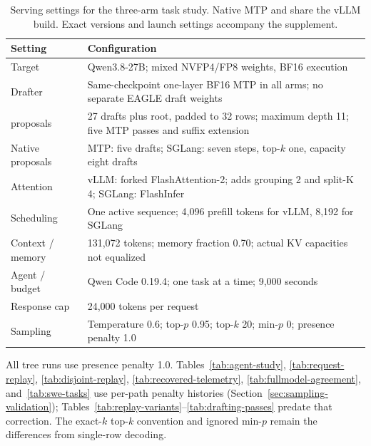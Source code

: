 \begin{table}[!htbp]
\caption{Serving settings for the three-arm task study. Native MTP and \sys{} share the vLLM build. Exact versions and launch settings accompany the supplement.}
\label{tab:serving-config}
\centering\footnotesize
\renewcommand{\arraystretch}{1.12}
\begin{tabularx}{\columnwidth}{@{}>{\raggedright\arraybackslash}p{}Y@{}}
\toprule
Setting & Configuration \\
\midrule
Target & Qwen3.8-27B; mixed NVFP4/FP8 weights, BF16 execution \\
Drafter & Same-checkpoint one-layer BF16 MTP in all arms; no separate EAGLE draft weights \\
\sys{} proposals & 27 drafts plus root, padded to 32 rows; maximum depth 11; five MTP passes and suffix extension \\
Native proposals & MTP: five drafts; SGLang: seven steps, top-$k$ one, capacity eight drafts \\
Attention & vLLM: forked FlashAttention-2; \sys{} adds grouping 2 and split-K 4; SGLang: FlashInfer \\
Scheduling & One active sequence; 4,096 prefill tokens for vLLM, 8,192 for SGLang \\
Context / memory & 131,072 tokens; memory fraction 0.70; actual KV capacities not equalized \\
Agent / budget & Qwen Code 0.19.4; one task at a time; 9,000 seconds \\
Response cap & 24,000 tokens per request \\
Sampling & Temperature 0.6; top-$p$ 0.95; top-$k$ 20; min-$p$ 0; presence penalty 1.0 \\
\bottomrule
\end{tabularx}
\end{table}

All tree runs use presence penalty 1.0. Tables~\ref{tab:agent-study}, \ref{tab:request-replay}, \ref{tab:disjoint-replay}, \ref{tab:recovered-telemetry}, \ref{tab:fullmodel-agreement}, and~\ref{tab:swe-tasks} use per-path penalty histories (Section~\ref{sec:sampling-validation}); Tables~\ref{tab:replay-variants}--\ref{tab:drafting-passes} predate that correction. The exact-$k$ top-$k$ convention and ignored min-$p$ remain the differences from single-row decoding.
